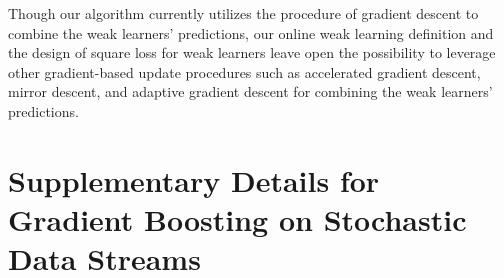 Though our \algshort algorithm currently utilizes the procedure of gradient descent to combine the weak learners’ predictions, our online weak learning definition and the design of square loss for weak learners leave open the possibility to leverage other gradient-based update procedures such as accelerated gradient descent, mirror descent, and adaptive gradient descent for combining the weak learners' predictions. %





%
%
\section{Supplementary Details for Gradient Boosting on Stochastic Data Streams}
\label{sec:sgb_appendix}

